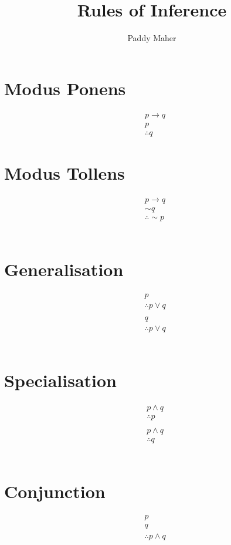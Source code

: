 \documentclass{article}
\title{Rules of Inference}
\author{Paddy Maher}
\begin{document}
\maketitle

\section{Modus Ponens}
\begin{align*}
& p \rightarrow q \\ 
& p \\
& \therefore q
\end{align*}

\section{Modus Tollens}
\begin{align*}
& p \rightarrow q \\ 
& \sim q \\
& \therefore \sim p
\end{align*} \\

\section{Generalisation}
\begin{align*}
& p \\ 
& \therefore p \lor q \\ \\
& q \\ 
& \therefore p \lor q 
\end{align*} \\

\section{Specialisation}
\begin{align*}
& p \wedge q \\ 
& \therefore p \\ \\
& p \wedge q \\ 
& \therefore q 
\end{align*} \\

\section{Conjunction}
\begin{align*}
& p \\ 
& q \\
& \therefore p \wedge q
\end{align*} \\
\end{document}
